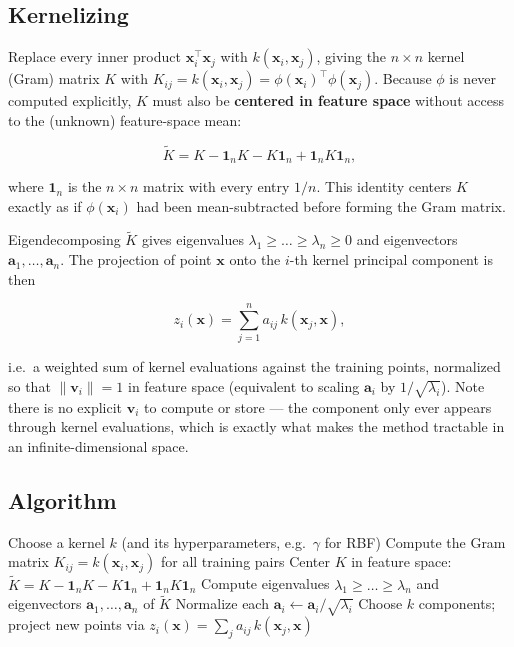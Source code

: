 \documentclass[11pt]{article}
\begin{document}
\subsection{Kernelizing}

Replace every inner product $\mathbf{x}_i^\top \mathbf{x}_j$ with
$k(\mathbf{x}_i, \mathbf{x}_j)$, giving the $n \times n$ kernel (Gram)
matrix $K$ with $K_{ij} = k(\mathbf{x}_i, \mathbf{x}_j) = \phi(\mathbf{x}_i)^\top
\phi(\mathbf{x}_j)$. Because $\phi$ is never computed explicitly, $K$ must
also be \textbf{centered in feature space} without access to the (unknown)
feature-space mean:

\[
  \tilde{K} = K - \mathbf{1}_n K - K \mathbf{1}_n + \mathbf{1}_n K \mathbf{1}_n,
\]

where $\mathbf{1}_n$ is the $n \times n$ matrix with every entry $1/n$.
This identity centers $K$ exactly as if $\phi(\mathbf{x}_i)$ had been
mean-subtracted before forming the Gram matrix.

Eigendecomposing $\tilde{K}$ gives eigenvalues $\lambda_1 \ge \dots \ge
\lambda_n \ge 0$ and eigenvectors $\mathbf{a}_1, \dots, \mathbf{a}_n$. The
projection of point $\mathbf{x}$ onto the $i$-th kernel principal component
is then

\[
  z_i(\mathbf{x}) = \sum_{j=1}^{n} a_{ij} \, k(\mathbf{x}_j, \mathbf{x}),
\]

i.e.\ a weighted sum of kernel evaluations against the training points,
normalized so that $\lVert \mathbf{v}_i \rVert = 1$ in feature space
(equivalent to scaling $\mathbf{a}_i$ by $1/\sqrt{\lambda_i}$). Note there
is no explicit $\mathbf{v}_i$ to compute or store --- the component only
ever appears through kernel evaluations, which is exactly what makes the
method tractable in an infinite-dimensional space.

\subsection{Algorithm}

\begin{algorithm}[h]
\caption{Kernel PCA}
\begin{algorithmic}[1]
\State Choose a kernel $k$ (and its hyperparameters, e.g.\ $\gamma$ for RBF)
\State Compute the Gram matrix $K_{ij} = k(\mathbf{x}_i, \mathbf{x}_j)$ for all training pairs
\State Center $K$ in feature space: $\tilde{K} = K - \mathbf{1}_n K - K \mathbf{1}_n + \mathbf{1}_n K \mathbf{1}_n$
\State Compute eigenvalues $\lambda_1 \ge \dots \ge \lambda_n$ and eigenvectors $\mathbf{a}_1, \dots, \mathbf{a}_n$ of $\tilde{K}$
\State Normalize each $\mathbf{a}_i \leftarrow \mathbf{a}_i / \sqrt{\lambda_i}$
\State Choose $k$ components; project new points via $z_i(\mathbf{x}) = \sum_j a_{ij} \, k(\mathbf{x}_j, \mathbf{x})$
\end{algorithmic}
\end{algorithm}
\end{document}
